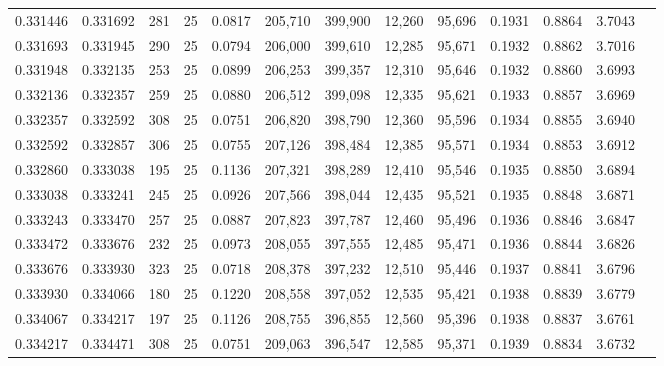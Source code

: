 \begin{tabular}{rrrrrrrrrrrrr}
0.331446 & 0.331692 &   281 &  25 &                                     0.0817 & 205,710 & 399,900 &  12,260 &  95,696 & 0.1931 & 0.8864 & 3.7043 \\
0.331693 & 0.331945 &   290 &  25 &                                     0.0794 & 206,000 & 399,610 &  12,285 &  95,671 & 0.1932 & 0.8862 & 3.7016 \\
0.331948 & 0.332135 &   253 &  25 &                                     0.0899 & 206,253 & 399,357 &  12,310 &  95,646 & 0.1932 & 0.8860 & 3.6993 \\
0.332136 & 0.332357 &   259 &  25 &                                     0.0880 & 206,512 & 399,098 &  12,335 &  95,621 & 0.1933 & 0.8857 & 3.6969 \\
0.332357 & 0.332592 &   308 &  25 &                                     0.0751 & 206,820 & 398,790 &  12,360 &  95,596 & 0.1934 & 0.8855 & 3.6940 \\
0.332592 & 0.332857 &   306 &  25 &                                     0.0755 & 207,126 & 398,484 &  12,385 &  95,571 & 0.1934 & 0.8853 & 3.6912 \\
0.332860 & 0.333038 &   195 &  25 &                                     0.1136 & 207,321 & 398,289 &  12,410 &  95,546 & 0.1935 & 0.8850 & 3.6894 \\
0.333038 & 0.333241 &   245 &  25 &                                     0.0926 & 207,566 & 398,044 &  12,435 &  95,521 & 0.1935 & 0.8848 & 3.6871 \\
0.333243 & 0.333470 &   257 &  25 &                                     0.0887 & 207,823 & 397,787 &  12,460 &  95,496 & 0.1936 & 0.8846 & 3.6847 \\
0.333472 & 0.333676 &   232 &  25 &                                     0.0973 & 208,055 & 397,555 &  12,485 &  95,471 & 0.1936 & 0.8844 & 3.6826 \\
0.333676 & 0.333930 &   323 &  25 &                                     0.0718 & 208,378 & 397,232 &  12,510 &  95,446 & 0.1937 & 0.8841 & 3.6796 \\
0.333930 & 0.334066 &   180 &  25 &                                     0.1220 & 208,558 & 397,052 &  12,535 &  95,421 & 0.1938 & 0.8839 & 3.6779 \\
0.334067 & 0.334217 &   197 &  25 &                                     0.1126 & 208,755 & 396,855 &  12,560 &  95,396 & 0.1938 & 0.8837 & 3.6761 \\
0.334217 & 0.334471 &   308 &  25 &                                     0.0751 & 209,063 & 396,547 &  12,585 &  95,371 & 0.1939 & 0.8834 & 3.6732 \\

\end{tabular}

